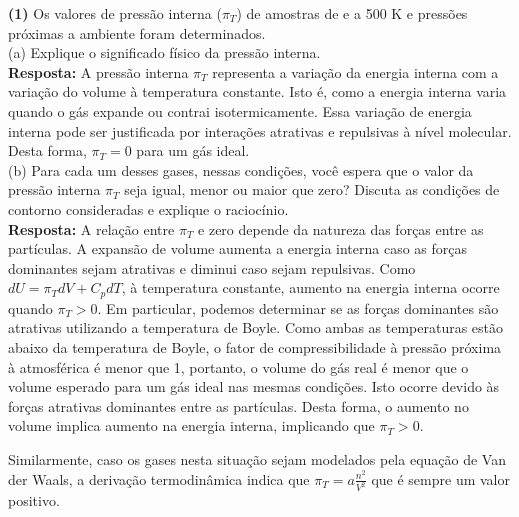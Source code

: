 \textbf{(1)} Os valores de pressão interna (\(\pi_T\)) de amostras de  e
 a 500 K e pressões próximas a ambiente foram determinados.\\

(a) Explique o significado físico da pressão interna.\\

\textbf{Resposta:}   A pressão interna \( \pi_T \) representa a variação da energia interna com a
   variação do volume à temperatura constante. Isto é, como a energia
   interna varia quando o gás expande ou contrai isotermicamente. Essa variação
   de energia interna pode ser justificada por interações atrativas e repulsivas
   à nível molecular. Desta forma, \( \pi_T = 0 \) para um gás ideal.\\

(b) Para cada um desses gases, nessas condições, você espera que o valor da
pressão interna \(\pi_T\)  seja igual, menor ou maior que zero? Discuta as
condições de contorno consideradas e explique o raciocínio.\\

\textbf{Resposta:} A relação entre \( \pi_T \) e zero depende da natureza das
forças entre as partículas. A expansão de volume aumenta a energia interna caso
as forças dominantes sejam atrativas e diminui caso sejam repulsivas. Como \( dU
= \pi_T dV + C_p dT \), à temperatura constante, aumento na energia interna ocorre
quando \( \pi_T > 0 \). Em particular, podemos determinar se as forças
dominantes são atrativas utilizando a temperatura de Boyle. Como ambas as
temperaturas estão abaixo da temperatura de Boyle, o fator de compressibilidade à
pressão próxima à atmosférica é menor que 1, portanto, o volume do gás real é
menor que o volume esperado para um gás ideal nas mesmas condições. Isto ocorre
devido às forças atrativas dominantes entre as partículas. Desta forma, o
aumento no volume implica aumento na energia interna, implicando que \( \pi_T >
0 \).

Similarmente, caso os gases nesta situação sejam modelados pela equação de Van
der Waals, a derivação termodinâmica indica que \( \pi_T = a \frac{n^2}{V^2} \)
que é sempre um valor positivo.


